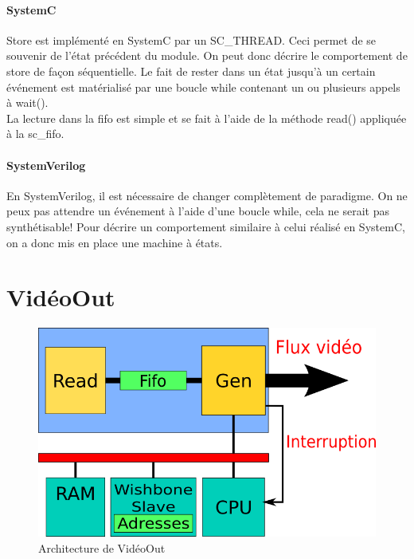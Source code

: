 \documentclass[a4paper,12pt]{report}
\begin{document}
{{                               \paragraph{SystemC}
                               Store est implémenté en SystemC par un SC\_THREAD.
                               Ceci permet de se souvenir de l'état précédent du module.
                               On peut donc décrire le comportement de store de façon séquentielle.
                               Le fait de rester dans un état jusqu'à un certain événement est matérialisé par une boucle while contenant un ou plusieurs appels à wait(). \\
                               La lecture dans la fifo est simple et se fait à l'aide de la méthode read() appliquée à la sc\_fifo.

                               \paragraph{SystemVerilog}
                               En SystemVerilog, il est nécessaire de changer complètement de paradigme.
                               On ne peux pas attendre un événement à l'aide d'une boucle while,
                               cela ne serait pas synthétisable!
                               Pour décrire un comportement similaire à celui réalisé en SystemC, on a donc mis en place une machine à états.




                               {}

                               \newpage

                               \section{VidéoOut}

                               \begin{figure}[!h]
	                         \centering
	                         \includegraphics[scale = 0.5]{video_out.png}
	                         \caption{Architecture de VidéoOut}
                               \end{figure}

}}
\end{document}
